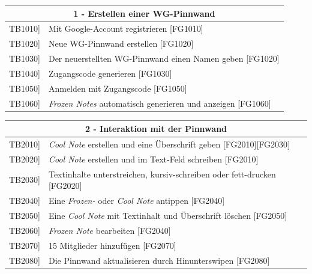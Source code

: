 \documentclass[a4paper]{scrreprt}
\begin{document}
	    \begin{table}[h!]
	    	\centering
	    	\label{my-label}
	    	\begin{tabular}{p{2cm}p{12cm}}
	    		
	    		\multicolumn{2}{c}{\textbf{1 - Erstellen einer WG-Pinnwand}} \\ \hline
	    		\centering{[}TB1010{]} & Mit Google-Account registrieren {[}FG1010{]}\\
	    		\centering{[}TB1020{]}& Neue WG-Pinnwand erstellen {[}FG1020{]}                                \\
	    		\centering{[}TB1030{]} & Der neuerstellten WG-Pinnwand einen Namen geben {[}FG1020{]} \\ 
	    		\centering{[}TB1040{]}& Zugangscode generieren {[}FG1030{]}\\ 
	    		\centering{[}TB1050{]}& Anmelden mit Zugangscode {[}FG1050{]}\\ 
	    		\centering{[}TB1060{]}& \textit{Frozen Notes} automatisch generieren und anzeigen {[}FG1060{]}\\ 
	    		\hline
	    	\end{tabular}
	    \end{table}
	    
	    \vspace{5mm}
	    
	    \begin{table}[h!]
	    	\centering
	    	\label{my-label}
	    	\begin{tabular}{p{2cm}p{12cm}}
	    		
	    		\multicolumn{2}{c}{\textbf{2 - Interaktion mit der Pinnwand}} \\ \hline
	    		\centering{[}TB2010{]} & \textit{Cool Note} erstellen und eine Überschrift geben {[}FG2010{]}{[}FG2030{]}\\
	    		\centering{[}TB2020{]} & \textit{Cool Note} erstellen und im Text-Feld schreiben {[}FG2010{]}\\
	    		\centering{[}TB2030{]} & Textinhalte unterstreichen, kursiv-schreiben oder fett-drucken {[}FG2020{]}\\
	    		\centering{[}TB2040{]} & Eine \textit{Frozen-} oder \textit{Cool Note} antippen {[}FG2040{]}\\ 
	    		\centering{[}TB2050{]} & Eine \textit{Cool Note} mit Textinhalt und Überschrift löschen {[}FG2050{]}\\ 
	    		\centering{[}TB2060{]} & \textit{Frozen Note} bearbeiten {[}FG2040{]}\\ 
				\centering{[}TB2070{]} & 15 Mitglieder hinzufügen {[}FG2070{]}\\ 

	    		\centering{[}TB2080{]} & Die Pinnwand aktualisieren durch Hinunterswipen {[}FG2080{]}\\ 
	    		\hline
	    	\end{tabular}
	    \end{table}
	    
\end{document}
